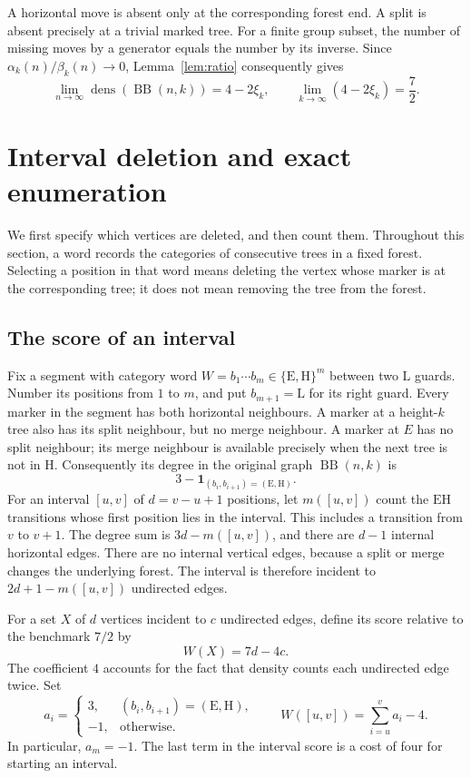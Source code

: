 \documentclass[11pt,a4paper]{article}
\theoremstyle{definition}
\theoremstyle{remark}
\newcommand{\dens}{\operatorname{dens}}
\newcommand{\BB}{\operatorname{BB}}
\newcommand{\E}{\mathrm E}
\newcommand{\HH}{\mathrm H}
\newcommand{\LL}{\mathrm L}
\newcommand{\ind}{\mathbf1}
\begin{document}
A horizontal move is absent only at the corresponding forest end. A split is absent precisely at a trivial marked tree. For a finite group subset, the number of missing moves by a generator equals the number by its inverse. Since $\alpha_k(n)/\beta_k(n)\to0$, Lemma~\ref{lem:ratio} consequently gives
\begin{equation}\label{eq:base}
\lim_{n\to\infty}\dens(\BB(n,k))=4-2\xi_k,
\qquad \lim_{k\to\infty}(4-2\xi_k)=\frac72.
\end{equation}

\section{Interval deletion and exact enumeration}\label{sec:horizontal}
We first specify which vertices are deleted, and then count them. Throughout this section, a word records the categories of consecutive trees in a fixed forest. Selecting a position in that word means deleting the vertex whose marker is at the corresponding tree; it does not mean removing the tree from the forest.

\subsection{The score of an interval}
Fix a segment with category word $W=b_1\cdots b_m\in\{\E,\HH\}^m$ between two $\LL$ guards. Number its positions from $1$ to $m$, and put $b_{m+1}=\LL$ for its right guard. Every marker in the segment has both horizontal neighbours. A marker at a height-$k$ tree also has its split neighbour, but no merge neighbour. A marker at $E$ has no split neighbour; its merge neighbour is available precisely when the next tree is not in $\HH$. Consequently its degree in the original graph $\BB(n,k)$ is
\[
3-\ind_{(b_i,b_{i+1})=(\E,\HH)}.
\]
For an interval $[u,v]$ of $d=v-u+1$ positions, let $m([u,v])$ count the $\E\HH$ transitions whose first position lies in the interval. This includes a transition from $v$ to $v+1$. The degree sum is $3d-m([u,v])$, and there are $d-1$ internal horizontal edges. There are no internal vertical edges, because a split or merge changes the underlying forest. The interval is therefore incident to $2d+1-m([u,v])$ undirected edges.

For a set $X$ of $d$ vertices incident to $c$ undirected edges, define its score relative to the benchmark $7/2$ by
\begin{equation}\label{eq:score}
W(X)=7d-4c.
\end{equation}
The coefficient $4$ accounts for the fact that density counts each undirected edge twice. Set
\begin{equation}\label{eq:localvalues}
a_i=\begin{cases}3,&(b_i,b_{i+1})=(\E,\HH),\\-1,&\text{otherwise}.
\end{cases}
\qquad W([u,v])=\sum_{i=u}^v a_i-4.
\end{equation}
In particular, $a_m=-1$. The last term in the interval score is a cost of four for starting an interval.
\end{document}
